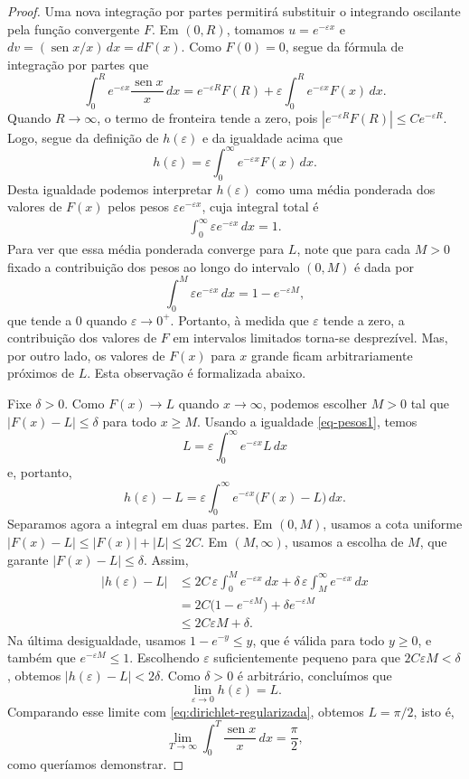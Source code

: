 \documentclass[12pt,portuguese]{article}
\theoremstyle{definition}
\theoremstyle{plainexercise}
\theoremstyle{starredexercise}
\theoremstyle{definition}
\renewcommand{\sin}{\operatorname{sen}}
\begin{document}
\begin{proof}
\medskip 

Uma nova integração por partes permitirá substituir o integrando oscilante
pela função convergente $F$. Em $(0,R)$, tomamos $u=e^{-\varepsilon x}$ e
$dv=(\sin x/x)\,dx=dF(x)$. Como $F(0)=0$, segue da fórmula de integração por partes que
\[
\int_0^R e^{-\varepsilon x}\frac{\sin x}{x}\,dx
=
e^{-\varepsilon R}F(R)
+
\varepsilon\int_0^R e^{-\varepsilon x}F(x)\,dx .
\]
Quando $R\to\infty$, o termo de fronteira tende a zero, pois
$|e^{-\varepsilon R}F(R)|\leqslant Ce^{-\varepsilon R}$. Logo,
segue da definição de $h(\varepsilon)$ e da igualdade acima que 
\[
h(\varepsilon)=\varepsilon\int_0^\infty e^{-\varepsilon x}F(x)\,dx .
\]
Desta igualdade podemos interpretar $h(\varepsilon)$ como uma média ponderada dos valores de $F(x)$ pelos pesos
$\varepsilon e^{-\varepsilon x}$, cuja integral total é
\begin{align}\label{eq-pesos1}
\int_0^\infty\varepsilon e^{-\varepsilon x}\,dx=1 .
\end{align}
Para ver que essa média ponderada converge para $L$, note que para cada $M>0$ fixado a
contribuição dos pesos ao longo do intervalo $(0,M)$ é dada por
\[
\int_0^M\varepsilon e^{-\varepsilon x}\,dx=1-e^{-\varepsilon M},
\]
que tende a $0$ quando $\varepsilon\to0^+$. Portanto, à medida
que $\varepsilon$ tende a zero, a contribuição dos valores de $F$ em
intervalos limitados torna-se desprezível. Mas, por outro lado, os valores de $F(x)$
para $x$ grande ficam arbitrariamente próximos de $L$. Esta observação é formalizada abaixo. 

Fixe $\delta>0$. Como $F(x)\to L$ quando $x\to\infty$, podemos escolher $M>0$ tal que
$|F(x)-L|\leqslant\delta$ para todo $x\geqslant M$. Usando a igualdade \eqref{eq-pesos1}, temos
\[
L=\varepsilon\int_0^\infty e^{-\varepsilon x}L\,dx
\]
e, portanto,
\[
h(\varepsilon)-L
=
\varepsilon\int_0^\infty e^{-\varepsilon x}\bigl(F(x)-L\bigr)\,dx .
\]
Separamos agora a integral em duas partes. Em $(0,M)$, usamos a cota uniforme
$|F(x)-L|\leqslant|F(x)|+|L|\leqslant2C$. Em $(M,\infty)$, usamos a
escolha de $M$, que garante $|F(x)-L|\leqslant\delta$. Assim,
\begin{align*}
|h(\varepsilon)-L|
&\leqslant
2C\,\varepsilon\int_0^M e^{-\varepsilon x}\,dx
+
\delta\,\varepsilon\int_M^\infty e^{-\varepsilon x}\,dx
\\[0.2cm]
&=
2C\bigl(1-e^{-\varepsilon M}\bigr)
+\delta e^{-\varepsilon M}
\\[0.2cm]
&\leqslant
2C\varepsilon M+\delta .
\end{align*}
Na última desigualdade, usamos $1-e^{-y}\leqslant y$, que é válida para todo $y\geqslant0$, e também que
$e^{-\varepsilon M}\leqslant1$. Escolhendo $\varepsilon$ suficientemente
pequeno para que $2C\varepsilon M<\delta$, obtemos
$|h(\varepsilon)-L|<2\delta$. Como $\delta>0$ é arbitrário, concluímos que
\[
\lim_{\varepsilon\to0}h(\varepsilon)=L .
\]
Comparando esse limite com \eqref{eq:dirichlet-regularizada}, obtemos
$L=\pi/2$, isto é,
\[
\lim_{T\to\infty}\int_0^T\frac{\sin x}{x}\,dx=\frac{\pi}{2},
\]
como queríamos demonstrar.
\end{proof}
\end{document}
